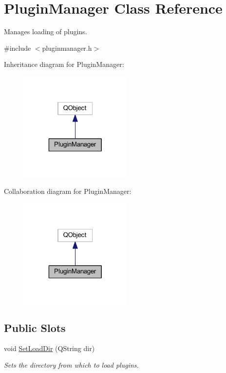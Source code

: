 \hypertarget{class_plugin_manager}{\section{Plugin\-Manager Class Reference}
\label{class_plugin_manager}
}


Manages loading of plugins.  




{\ttfamily \#include $<$pluginmanager.\-h$>$}



Inheritance diagram for Plugin\-Manager\-:
\nopagebreak
\begin{figure}[H]
\begin{center}
\leavevmode
\includegraphics[width=160pt]{class_plugin_manager__inherit__graph}
\end{center}
\end{figure}


Collaboration diagram for Plugin\-Manager\-:
\nopagebreak
\begin{figure}[H]
\begin{center}
\leavevmode
\includegraphics[width=160pt]{class_plugin_manager__coll__graph}
\end{center}
\end{figure}
\subsection*{Public Slots}
\begin{DoxyCompactItemize}
\item 
void \hyperlink{class_plugin_manager_a2e8795656b18a1ff483f2d7a4a6b7988}{Set\-Load\-Dir} (Q\-String dir)
\begin{DoxyCompactList}\small\item\em Sets the directory from which to load plugins. \end{DoxyCompactList}\end{DoxyCompactItemize}

